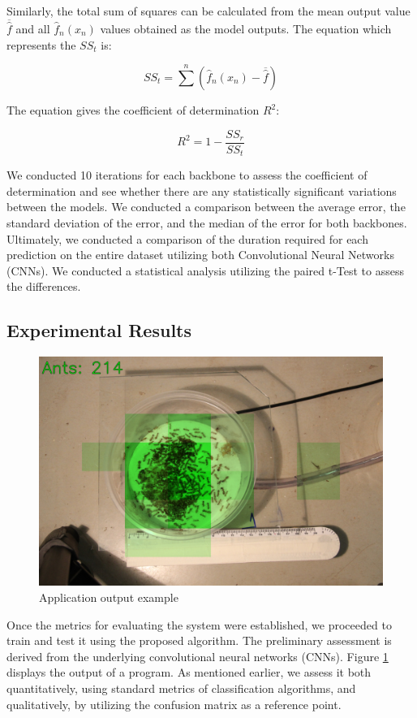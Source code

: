 Similarly, the total sum of squares can be calculated from the mean output value $\overline{\hat{f}}$ and all $\hat{f}_n(x_n)$ values obtained as the model outputs. The equation which represents the $SS_t$ is:

\begin{equation}
    SS_t = \sum^n (\hat{f}_n(x_n) - \overline{\hat{f}}) 
\end{equation}

The equation gives the coefficient of determination $R^2$:

\begin{equation}
    R^2 = 1 - \frac{SS_r}{SS_t}
\end{equation}

We conducted 10 iterations for each backbone to assess the coefficient of determination and see whether there are any statistically significant variations between the models. We conducted a comparison between the average error, the standard deviation of the error, and the median of the error for both backbones. Ultimately, we conducted a comparison of the duration required for each prediction on the entire dataset utilizing both Convolutional Neural Networks (CNNs). We conducted a statistical analysis utilizing the paired t-Test to assess the differences.

\subsection{{Experimental Results}}

\begin{figure}[htb!]
    \centering
    \includegraphics[width = .8\linewidth]{Figures/example.JPG}
    \caption{Application output example}
    \label{fig:example}
\end{figure}

Once the metrics for evaluating the system were established, we proceeded to train and test it using the proposed algorithm. The preliminary assessment is derived from the underlying convolutional neural networks (CNNs). Figure \ref{fig:example} displays the output of a program. As mentioned earlier, we assess it both quantitatively, using standard metrics of classification algorithms, and qualitatively, by utilizing the confusion matrix as a reference point.

